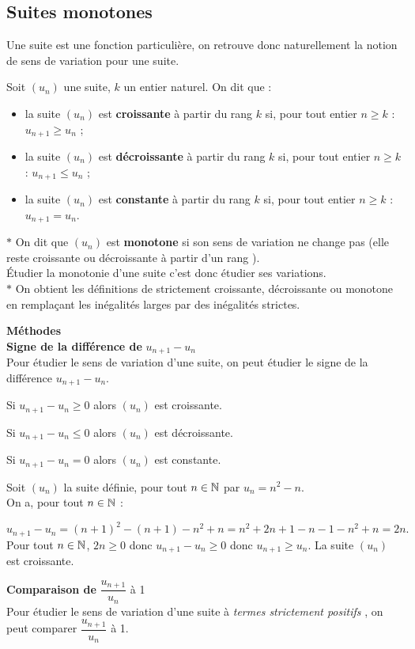 \subsection*{Suites monotones}
Une suite est une fonction particulière, on retrouve donc naturellement la notion de sens de variation pour une suite.

\begin{definition} Soit $(u_{n})$ une suite, $ k $ un entier naturel. On dit que :
\begin{itemize}
\item[\textbullet] la suite $(u_{n})$   est  \textbf{\color{magenta} croissante}  à partir du rang $ k $ si, pour tout entier  $ n \geq k $ : $  u_{n+1}\geq u_{n} $ ;
\item[\textbullet]la suite $(u_{n})$   est   \textbf{\color{magenta} décroissante} à partir du rang $ k $ si, pour tout entier  $ n \geq  k $ : $ u_{n+1}\leq u_{n}$ ;
\item[\textbullet]la suite $(u_{n})$  est   \textbf{\color{magenta}constante} à partir du rang $ k $  si, pour tout entier $ n\geq k $ : $ u_{n+1}= u_{n}$.
\end{itemize}
\end{definition}

\begin{remark}
$ \ast $ On dit que $(u_{n})$ est  \textbf{monotone}  si son sens
de variation ne change pas (elle reste croissante  ou décroissante  à partir d'un rang ).\\
Étudier la monotonie d'une suite c'est donc étudier ses variations.\\
 $ \ast$ On obtient les définitions de strictement croissante, décroissante ou monotone en remplaçant les inégalités larges par des inégalités strictes.
\end{remark}

\textbf{Méthodes}\\
\textbf{Signe de la différence de }  $ u_{n+1}- u_{n} $ \\
 Pour étudier le sens de variation d'une suite, on peut étudier le signe de la différence   $  u_{n+1}- u_{n} $.

Si $ u_{n+1}- u_{n}\geq 0 $ alors $(u_{n})$ est croissante.

Si $ u_{n+1}- u_{n}\leq 0 $ alors $(u_{n})$ est décroissante.

Si $ u_{n+1}- u_{n}=0 $ alors $(u_{n})$ est constante.
\begin{example} 
 Soit $(u_{n})$ la suite définie, pour tout $ n\in\mathbb{N} $ par $ u_{n} = n^{2} -n $.  \\              On a, pour tout $ n\in\mathbb{N} $ :

 $ u_{n+1}- u_{n} = (n +1)^{2} -(n +1)-n^{2} +n = n^{2} +2n +1-n -1-n^{2} +n = 2n. $
Pour tout $ n\in\mathbb{N} $, $2n \geq 0  $ donc $ u_{n+1}- u_{n}\geq 0 $ donc $ u_{n+1}\geq u_{n} $. 
La suite  $(u_{n})$  est croissante.
\end{example}
\textbf{Comparaison de } $ \dfrac{u_{n+1}}{u_{n}} $ à 1 \\
 Pour étudier le sens de variation d'une suite à \emph{termes strictement positifs } , on peut comparer $ \dfrac{u_{n+1}}{u_{n}} $   à 1.

